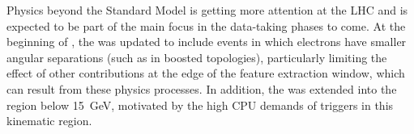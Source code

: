 Physics beyond the Standard Model is getting more attention at the LHC and is expected to be part of the main focus in the data-taking phases to
come. At the beginning of \RunThr, the \rnn was updated to include events in which electrons have smaller angular separations (such as in boosted topologies), particularly limiting the effect of other contributions at
the edge of the feature extraction window, which can result from these physics
processes. In addition, the \rnn was extended into the \ET region below 15~GeV, motivated by the high CPU demands of triggers in this kinematic region.

